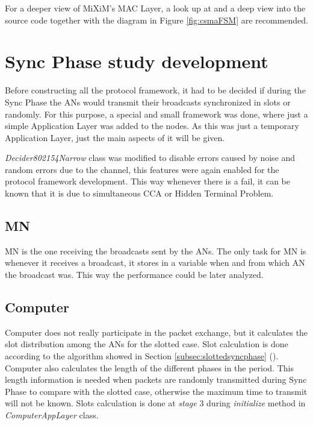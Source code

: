For a deeper view of \ac{MiXiM}'s \ac{MAC} Layer, a look up at \cite{MiXiM} and a deep view into the source code together with the diagram in Figure 
\ref{fig:csmaFSM} are recommended.


\section{Sync Phase study development}

Before constructing all the protocol framework, it had to be decided if during the Sync Phase the \acp{AN} would transmit their broadcasts 
synchronized in slots or randomly. For this purpose, a special and small framework was done, where just a simple Application Layer was added to 
the nodes. As this was just a temporary Application Layer, just the main aspects of it will be given.

\textit{Decider802154Narrow} class was modified to disable errors caused by noise and random errors due to the channel, this features were 
again enabled for the protocol framework development. This way whenever there is a fail, it can be known that it is due to simultaneous \ac{CCA}
or Hidden Terminal Problem.

\subsection{\ac{MN}}

\ac{MN} is the one receiving the broadcasts sent by the \acp{AN}. The only task for \ac{MN} is whenever it receives a broadcast, it stores in a
variable when and from which \ac{AN} the broadcast was. This way the performance could be later analyzed.

\subsection{Computer}

Computer does not really participate in the packet exchange, but it calculates the slot distribution among the \acp{AN} for the slotted case. 
Slot calculation is done according to the algorithm showed in Section \ref{subsec:slottedsyncphase} (). Computer 
also calculates the length of the different phases in the period. This length information is needed when packets are randomly transmitted 
during Sync Phase to compare with the slotted case, otherwise the maximum time to transmit will not be known. Slots calculation is done at
\textit{stage} 3 during \textit{initialize} method in \textit{ComputerAppLayer} class.

